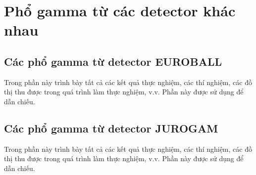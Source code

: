 \chapter{Phổ gamma từ các detector khác nhau}
\label{phuluc:cacdothi}

\section{Các phổ gamma từ detector EUROBALL} 
Trong phần này trình bày tất cả các kết quả thực nghiệm, các thí nghiệm, các đồ thị thu được trong quá trình làm thực nghiệm, v.v. Phần này được sử dụng để dẫn chiếu.

\section{Các phổ gamma từ detector JUROGAM}
Trong phần này trình bày tất cả các kết quả thực nghiệm, các thí nghiệm, các đồ thị thu được trong quá trình làm thực nghiệm, v.v. Phần này được sử dụng để dẫn chiếu.